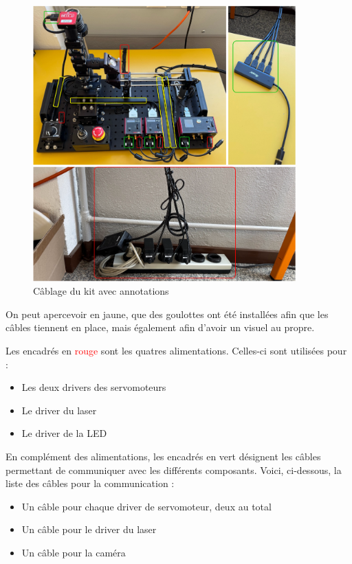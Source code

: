 \begin{figure}[H]
    \begin{center}
        \includegraphics[width=0.9\textwidth]{assets/figures/Cablage_du_kit/Cablage_annote.png}
    \end{center}
    \caption{Câblage du kit avec annotations}
    \label{cablage_kit_annoté}
\end{figure}

On peut apercevoir en \textcolor[RGB]{230, 230, 0}{jaune}, que des goulottes ont été installées afin que les câbles tiennent en place, mais également afin d'avoir un visuel au propre.

Les encadrés en \textcolor{red}{rouge} sont les quatres alimentations. Celles-ci sont utilisées pour :
\begin{itemize}
    \item Les deux drivers des servomoteurs
    \item Le driver du laser
    \item Le driver de la LED
\end{itemize}

En complément des alimentations, les encadrés en \textcolor[RGB]{0, 201, 18}{vert} désignent les câbles permettant de communiquer avec les différents composants. Voici, ci-dessous, la liste des câbles pour la communication :
\begin{itemize}
    \item Un câble pour chaque driver de servomoteur, deux au total
    \item Un câble pour le driver du laser
    \item Un câble pour la caméra
\end{itemize}